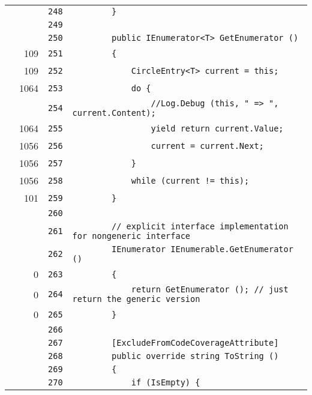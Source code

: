 \documentclass[a4paper,10pt]{article}
\begin{document}
\begin{longtable}[l]{lrrl}
\cellcolor{gray} &  & \verb~248~ & \verb~        }~\\
\cellcolor{gray} &  & \verb~249~ & \verb~~\\
\cellcolor{gray} &  & \verb~250~ & \verb~        public IEnumerator<T> GetEnumerator ()~\\
\cellcolor{green} & 109 & \verb~251~ & \verb~        {~\\
\cellcolor{green} & 109 & \verb~252~ & \verb~            CircleEntry<T> current = this;~\\
\cellcolor{green} & 1064 & \verb~253~ & \verb~            do {~\\
\cellcolor{gray} &  & \verb~254~ & \verb~                //Log.Debug (this, " => ", current.Content);~\\
\cellcolor{green} & 1064 & \verb~255~ & \verb~                yield return current.Value;~\\
\cellcolor{green} & 1056 & \verb~256~ & \verb~                current = current.Next;~\\
\cellcolor{green} & 1056 & \verb~257~ & \verb~            }~\\
\cellcolor{green} & 1056 & \verb~258~ & \verb~            while (current != this);~\\
\cellcolor{green} & 101 & \verb~259~ & \verb~        }~\\
\cellcolor{gray} &  & \verb~260~ & \verb~~\\
\cellcolor{gray} &  & \verb~261~ & \verb~        // explicit interface implementation for nongeneric interface~\\
\cellcolor{gray} &  & \verb~262~ & \verb~        IEnumerator IEnumerable.GetEnumerator ()~\\
\cellcolor{red} & 0 & \verb~263~ & \verb~        {~\\
\cellcolor{red} & 0 & \verb~264~ & \verb~            return GetEnumerator (); // just return the generic version~\\
\cellcolor{red} & 0 & \verb~265~ & \verb~        }~\\
\cellcolor{gray} &  & \verb~266~ & \verb~~\\
\cellcolor{gray} &  & \verb~267~ & \verb~        [ExcludeFromCodeCoverageAttribute]~\\
\cellcolor{gray} &  & \verb~268~ & \verb~        public override string ToString ()~\\
\cellcolor{gray} &  & \verb~269~ & \verb~        {~\\
\cellcolor{gray} &  & \verb~270~ & \verb~            if (IsEmpty) {~\\

\end{longtable}
\end{document}

